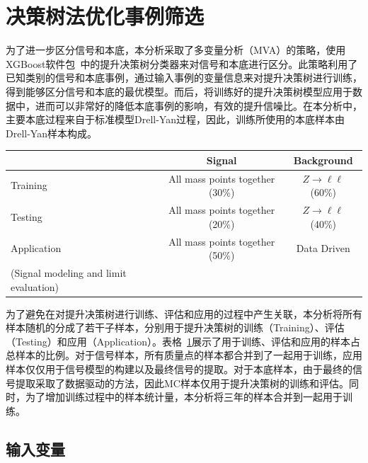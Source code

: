 \section{决策树法优化事例筛选}\label{sec:BDT}

为了进一步区分信号和本底，本分析采取了多变量分析（MVA）的策略，使用XGBoost软件包~\cite{XGBoost}中的提升决策树分类器来对信号和本底进行区分。此策略利用了已知类别的信号和本底事例，通过输入事例的变量信息来对提升决策树进行训练，得到能够区分信号和本底的最优模型。而后，将训练好的提升决策树模型应用于数据中，进而可以非常好的降低本底事例的影响，有效的提升信噪比。在本分析中，主要本底过程来自于标准模型Drell-Yan过程，因此，训练所使用的本底样本由Drell-Yan样本构成。

\begin{table}[h]
  \begin{center}
    \scriptsize
    \begin{tabular}{lcc} \hline
        & Signal & Background \\ \hline
       Training & All mass points together (30\%) & $Z\rightarrow\ell\ell$ (60\%) \\ \hline
       Testing & All mass points together (20\%) & $Z\rightarrow\ell\ell$ (40\%) \\ \hline
       Application & All mass points together (50\%) & Data Driven \\
       (Signal modeling and limit evaluation) &  & \\ \hline
    \end{tabular}
    \label{tab:process}
  \end{center}
\end{table}

为了避免在对提升决策树进行训练、评估和应用的过程中产生关联，本分析将所有样本随机的分成了若干子样本，分别用于提升决策树的训练（Training）、评估（Testing）和应用（Application）。表格~\ref{tab:process}展示了用于训练、评估和应用的样本占总样本的比例。对于信号样本，所有质量点的样本都合并到了一起用于训练，应用样本仅仅用于信号模型的构建以及最终信号的提取。对于本底样本，由于最终的信号提取采取了数据驱动的方法，因此MC样本仅用于提升决策树的训练和评估。同时，为了增加训练过程中的样本统计量，本分析将三年的样本合并到一起用于训练。

\subsection{输入变量}

